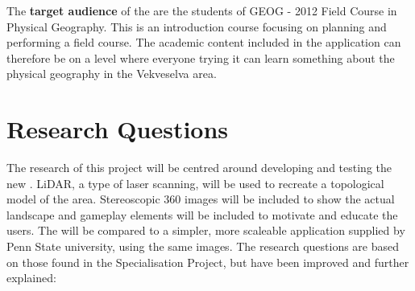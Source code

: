     The \textbf{target audience} of the \ApplicationName are the students of GEOG - 2012 Field Course in Physical Geography. This is an introduction course focusing on planning and performing a field course. The academic content included in the application can therefore be on a level where everyone trying it can learn something about the physical geography in the Vekveselva area.

\section{Research Questions}
    The research of this project will be centred around developing and testing the new \ApplicationName. LiDAR, a type of laser scanning, will be used to recreate a topological model of the area. Stereoscopic 360 images will be included to show the actual landscape and gameplay elements will be included to motivate and educate the users. The \ApplicationName \hspace{0.1cm}will be compared to a simpler, more scaleable application supplied by Penn State university, using the same images. The research questions are based on those found in the Specialisation Project\cite{specialisation}, but have been improved and further explained:
    
    \SPACE
    
